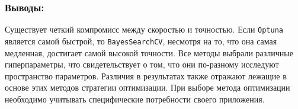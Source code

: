 \documentclass{article}
\begin{document}
\subsubsection{Выводы:}
Существует четкий компромисс между скоростью и точностью. Если \texttt{Optuna} является самой быстрой, то \texttt{BayesSearchCV}, несмотря на то, что она самая медленная, достигает самой высокой точности. Все методы выбрали различные гиперпараметры, что свидетельствует о том, что они по-разному исследуют пространство параметров. Различия в результатах также отражают лежащие в основе этих методов стратегии оптимизации. При выборе метода оптимизации необходимо учитывать специфические потребности своего приложения.



\end{document}
